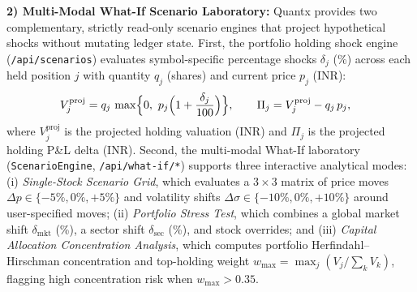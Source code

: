 \documentclass[journal,onecolumn,10pt]{IEEEtran}
\begin{document}
\textbf{2) Multi-Modal What-If Scenario Laboratory:} Quantx provides two complementary, strictly read-only scenario engines that project hypothetical shocks without mutating ledger state. First, the portfolio holding shock engine (\texttt{/api/scenarios}) evaluates symbol-specific percentage shocks $\delta_j$ (\%) across each held position $j$ with quantity $q_j$ (shares) and current price $p_j$ (INR):
\begin{equation}
\begin{aligned}
V^{\mathrm{proj}}_j &= q_j\,\max\Bigl\{0,\ p_j\Bigl(1+\frac{\delta_j}{100}\Bigr)\Bigr\},\qquad
\Pi_j = V^{\mathrm{proj}}_j - q_j\,p_j,
\end{aligned}
\label{eq:whatif}
\end{equation}
where $V^{\mathrm{proj}}_j$ is the projected holding valuation (INR) and $\Pi_j$ is the projected holding P\&L delta (INR). Second, the multi-modal What-If laboratory (\texttt{ScenarioEngine}, \texttt{/api/what-if/*}) supports three interactive analytical modes: (i) \emph{Single-Stock Scenario Grid}, which evaluates a $3\times 3$ matrix of price moves $\Delta p \in \{-5\%, 0\%, +5\%\}$ and volatility shifts $\Delta \sigma \in \{-10\%, 0\%, +10\%\}$ around user-specified moves; (ii) \emph{Portfolio Stress Test}, which combines a global market shift $\delta_{\mathrm{mkt}}$ (\%), a sector shift $\delta_{\mathrm{sec}}$ (\%), and stock overrides; and (iii) \emph{Capital Allocation Concentration Analysis}, which computes portfolio Herfindahl--Hirschman concentration and top-holding weight $w_{\max} = \max_j (V_j / \sum_k V_k)$, flagging high concentration risk when $w_{\max} > 0.35$.
\end{document}
